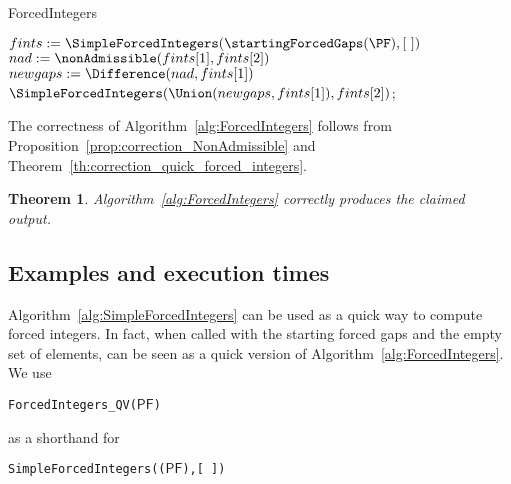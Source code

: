 \documentclass[11pt]{amsart}
\newtheorem{theorem}{Theorem}
\theoremstyle{remark}
\begin{document}
\begin{algorithm}[ht]\caption{ForcedIntegers\label{alg:ForcedIntegers}}
\Input{\PF}

    $fints := \SimpleForcedIntegers(\startingForcedGaps(\PF),[\ ])$\;
    $nad := \nonAdmissible(fints[1],fints[2])$\;   
    $newgaps := \Difference(nad,fints[1])$\;
    \Return $\SimpleForcedIntegers(\Union(newgaps,fints[1]),fints[2])$;
\end{algorithm}
The correctness of Algorithm~\ref{alg:ForcedIntegers} follows from Proposition~\ref{prop:correction_NonAdmissible} and Theorem~\ref{th:correction_quick_forced_integers}.
\begin{theorem}\label{th:correction_forced_integers}
Algorithm~\ref{alg:ForcedIntegers} correctly produces the claimed output.
\end{theorem}

\subsection{Examples and execution times}
\label{subsec:examples_and_execution_times}
Algorithm~\ref{alg:SimpleForcedIntegers} can be used as a quick way to compute forced integers. In fact, when called with the starting forced gaps and the empty set of elements, can be seen as a quick version of Algorithm~\ref{alg:ForcedIntegers}. We use \begin{center}
\texttt{ForcedIntegers\_QV({\ensuremath{\mathsf{PF}}})}\end{center} 
 as a shorthand for \begin{center}
\texttt{SimpleForcedIntegers(\startingForcedGaps({\ensuremath{\mathsf{PF}}}),[\ ])}
\end{center} 
\end{document}
